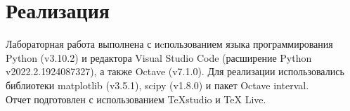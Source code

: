 \section{Реализация}
\begin{flushleft}
	Лабораторная работа выполнена с иcпользованием языка программирования Python (v3.10.2) и редактора Visual Studio Code (расширение Python v2022.2.1924087327), а также Octave (v7.1.0).
	Для реализации использовались библиотеки matplotlib (v3.5.1), scipy (v1.8.0) и пакет Octave interval.\\
	Отчет подготовлен с использованием TeXstudio и TeX Live.
\end{flushleft}